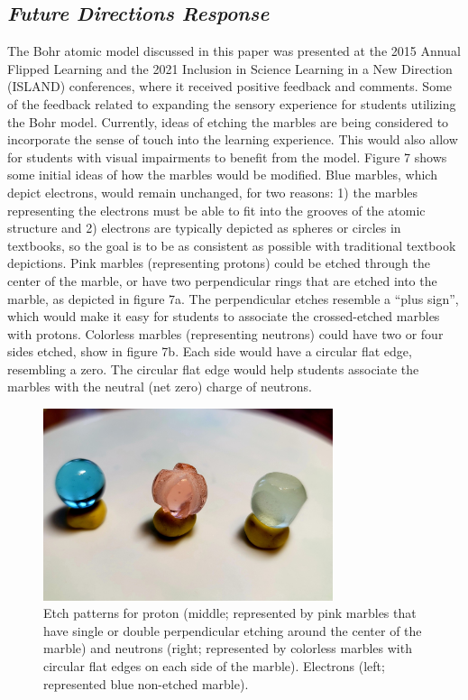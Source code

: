 \documentclass[11pt]{sig-alternate}
\begin{document}
\begin{large}
\section*{\textit{Future Directions Response}}	

The Bohr atomic model discussed in this paper was presented at the 2015 Annual Flipped Learning and the 2021 Inclusion in Science Learning in a New Direction (ISLAND) conferences, where it received positive feedback and comments.  Some of the feedback related to expanding the sensory experience for students utilizing the Bohr model. Currently, ideas of etching the marbles are being considered to incorporate the sense of touch into the learning experience.  This would also allow for students with visual impairments to benefit from the model.  
Figure 7 shows some initial ideas of how the marbles would be modified.  Blue marbles, which depict electrons, would remain unchanged, for two reasons: 1) the marbles representing the electrons must be able to fit into the grooves of the atomic structure and 2) electrons are typically depicted as spheres or circles in textbooks, so the goal is to be as consistent as possible with traditional textbook depictions.
Pink marbles (representing protons) could be etched through the center of the marble, or have two perpendicular rings that are etched into the marble, as depicted in figure 7a.  The perpendicular etches resemble a “plus sign”, which would make it easy for students to associate the crossed-etched marbles with protons.  Colorless marbles (representing neutrons) could have two or four sides etched, show in figure 7b.  Each side would have a circular flat edge, resembling a zero.  The circular flat edge would help students associate the marbles with the neutral (net zero) charge of neutrons.

\begin{figure}[htp]
    \centering
    \includegraphics[width=8.5cm]{Figure7.png}
    \caption{Etch patterns for proton (middle; represented by pink marbles that have single or double perpendicular etching around the center of the marble) and neutrons (right; represented by colorless marbles with circular flat edges on each side of the marble).  Electrons (left; represented blue non-etched marble).}
    \label{Etch patterns for proton.}
    \label{Figure shows three different colored marbles with different etched textures.}
\end{figure}


\end{large}
\end{document}
